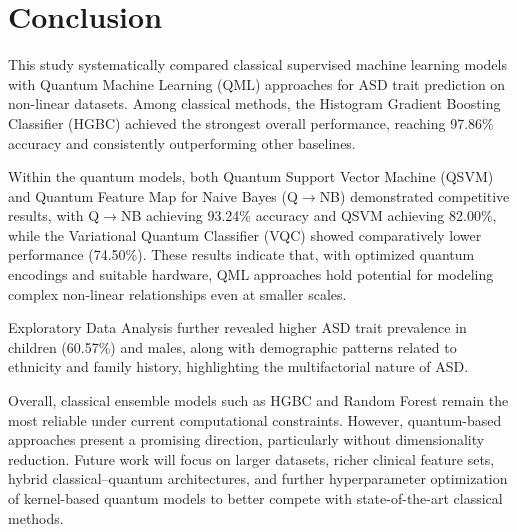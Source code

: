 \documentclass[runningheads]{llncs}
\begin{document}
\section{Conclusion}
\label{sec:conclusion}

This study systematically compared classical supervised machine learning models with Quantum Machine Learning (QML) approaches for ASD trait prediction on non-linear datasets. Among classical methods, the Histogram Gradient Boosting Classifier (HGBC) achieved the strongest overall performance, reaching 97.86\% accuracy and consistently outperforming other baselines.

Within the quantum models, both Quantum Support Vector Machine (QSVM) and Quantum Feature Map for Naive Bayes (Q$\rightarrow$NB) demonstrated competitive results, with Q$\rightarrow$NB achieving 93.24\% accuracy and QSVM achieving 82.00\%, while the Variational Quantum Classifier (VQC) showed comparatively lower performance (74.50\%). These results indicate that, with optimized quantum encodings and suitable hardware, QML approaches hold potential for modeling complex non-linear relationships even at smaller scales.

Exploratory Data Analysis further revealed higher ASD trait prevalence in children (60.57\%) and males, along with demographic patterns related to ethnicity and family history, highlighting the multifactorial nature of ASD.

Overall, classical ensemble models such as HGBC and Random Forest remain the most reliable under current computational constraints. However, quantum-based approaches present a promising direction, particularly without dimensionality reduction. Future work will focus on larger datasets, richer clinical feature sets, hybrid classical--quantum architectures, and further hyperparameter optimization of kernel-based quantum models to better compete with state-of-the-art classical methods.
\end{document}
